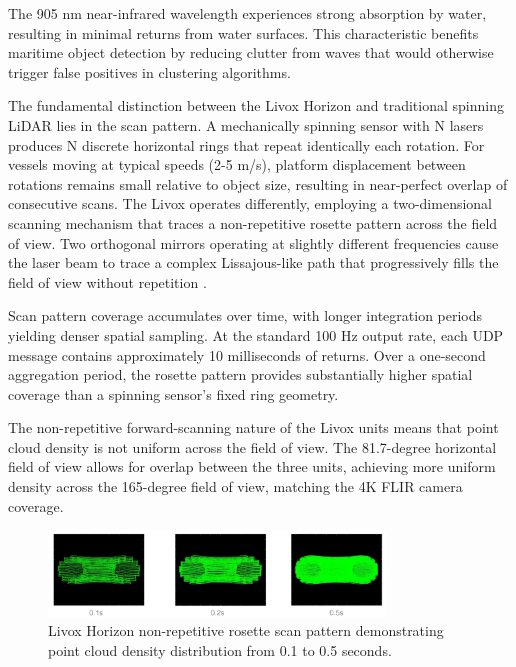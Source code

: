 \documentclass{erauthesis}
\begin{document}
The 905 nm near-infrared wavelength experiences strong absorption by water, resulting in minimal returns from water surfaces.
This characteristic benefits maritime object detection by reducing clutter from waves that would otherwise trigger false positives in clustering algorithms.

The fundamental distinction between the Livox Horizon and traditional spinning \ac{LiDAR} lies in the scan pattern.
A mechanically spinning sensor with N lasers produces N discrete horizontal rings that repeat identically each rotation.
For vessels moving at typical speeds (2-5 m/s), platform displacement between rotations remains small relative to object size, resulting in near-perfect overlap of consecutive scans.
The Livox operates differently, employing a two-dimensional scanning mechanism that traces a non-repetitive rosette pattern across the field of view.
Two orthogonal mirrors operating at slightly different frequencies cause the laser beam to trace a complex Lissajous-like path that progressively fills the field of view without repetition \cite{thompson2023}.

Scan pattern coverage accumulates over time, with longer integration periods yielding denser spatial sampling.
At the standard 100 Hz output rate, each \ac{UDP} message contains approximately 10 milliseconds of returns.
Over a one-second aggregation period, the rosette pattern provides substantially higher spatial coverage than a spinning sensor's fixed ring geometry.

The non-repetitive forward-scanning nature of the Livox units means that point cloud density is not uniform across the field of view.
The 81.7-degree horizontal field of view allows for overlap between the three units, achieving more uniform density across the 165-degree field of view, matching the 4K FLIR camera coverage.

\begin{figure}[htbp]
\centering
\includegraphics[width=0.8\textwidth]{Images/Livox_1.png}
\caption{Livox Horizon non-repetitive rosette scan pattern demonstrating point cloud density distribution from 0.1 to 0.5 seconds.}
\label{fig:livox_scan_pattern}
\end{figure}
\end{document}
